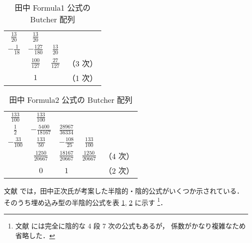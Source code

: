 \begin{table}[bp]
    \caption{田中 Formula1 公式の Butcher 配列}
    \label{table:ode_runge-kutta_butcher-array-tanaka-formula1}
    \centering
    \begin{tabular}{c|ccc}
        $\frac{13}{20}$ & $\frac{13}{20}$    &                  &          \\
        $-\frac{1}{18}$ & $-\frac{127}{180}$ & $\frac{13}{20}$  &          \\
        \hline
                        & $\frac{100}{127}$  & $\frac{27}{127}$ & （3 次） \\
                        & $1$                &                  & （1 次）
    \end{tabular}
\end{table}

\begin{table}[bp]
    \caption{田中 Formula2 公式の Butcher 配列}
    \label{table:ode_runge-kutta_butcher-array-tanaka-formula2}
    \centering
    \begin{tabular}{c|cccc}
        $\frac{133}{100}$ & $\frac{133}{100}$     &                       &                      &          \\
        $\frac{1}{2}$     & $-\frac{5400}{18167}$ & $\frac{28967}{36334}$ &                      &          \\
        $-\frac{33}{100}$ & $\frac{133}{50}$      & $-\frac{108}{25}$     & $\frac{133}{100}$    &          \\
        \hline
                          & $\frac{1250}{20667}$  & $\frac{18167}{20667}$ & $\frac{1250}{20667}$ & （4 次） \\
                          & $0$                   & $1$                   &                      & （2 次）
    \end{tabular}
\end{table}

文献 \cite{Togawa2007} では，田中正次氏が考案した半陰的・陰的公式がいくつか示されている．
そのうち埋め込み型の半陰的公式を表
\ref{table:ode_runge-kutta_butcher-array-tanaka-formula1},
\ref{table:ode_runge-kutta_butcher-array-tanaka-formula2}
に示す
\footnote{文献 \cite{Togawa2007} には完全に陰的な 4 段 7 次の公式もあるが，%
    係数がかなり複雑なため省略した．}．
